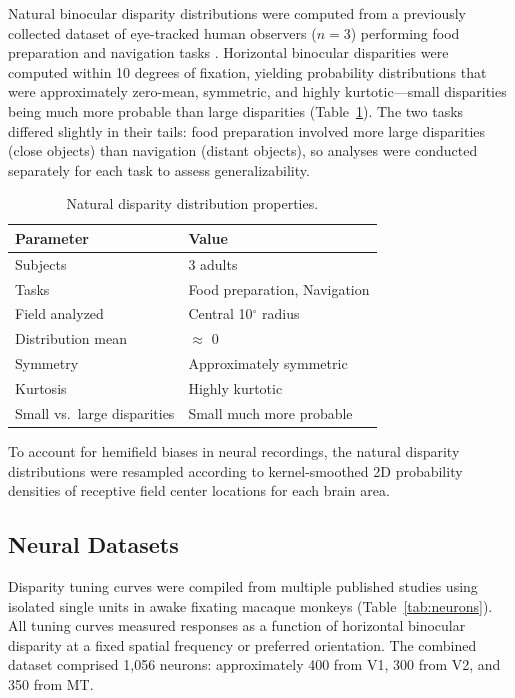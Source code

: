 \documentclass[12pt]{article}
\begin{document}
Natural binocular disparity distributions were computed from a previously collected dataset of eye-tracked human observers ($n = 3$) performing food preparation and navigation tasks \citep{sprague2015stereopsis}. Horizontal binocular disparities were computed within 10 degrees of fixation, yielding probability distributions that were approximately zero-mean, symmetric, and highly kurtotic---small disparities being much more probable than large disparities (Table~\ref{tab:disparity}). The two tasks differed slightly in their tails: food preparation involved more large disparities (close objects) than navigation (distant objects), so analyses were conducted separately for each task to assess generalizability.

\begin{table}[ht]
\centering
\caption{Natural disparity distribution properties.}
\label{tab:disparity}
\begin{tabular}{ll}
\toprule
Parameter & Value \\
\midrule
Subjects & 3 adults \\
Tasks & Food preparation, Navigation \\
Field analyzed & Central 10$^{\circ}$ radius \\
Distribution mean & $\approx$ 0 \\
Symmetry & Approximately symmetric \\
Kurtosis & Highly kurtotic \\
Small vs.\ large disparities & Small much more probable \\
\bottomrule
\end{tabular}
\end{table}

To account for hemifield biases in neural recordings, the natural disparity distributions were resampled according to kernel-smoothed 2D probability densities of receptive field center locations for each brain area.

\subsection{Neural Datasets}

Disparity tuning curves were compiled from multiple published studies using isolated single units in awake fixating macaque monkeys (Table~\ref{tab:neurons}). All tuning curves measured responses as a function of horizontal binocular disparity at a fixed spatial frequency or preferred orientation. The combined dataset comprised 1,056 neurons: approximately 400 from V1, 300 from V2, and 350 from MT.
\end{document}
